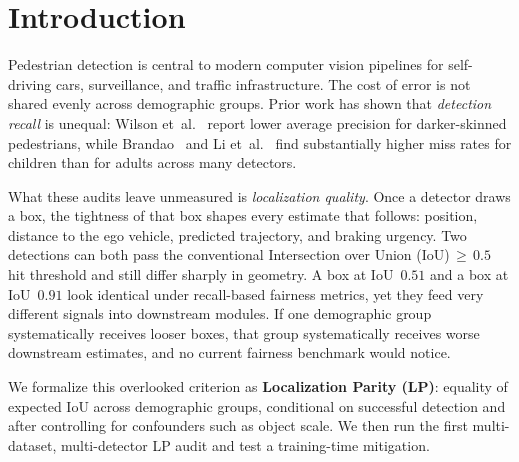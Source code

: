 \documentclass[runningheads]{llncs}
\begin{document}
\section{Introduction}
\label{sec:intro}

Pedestrian detection is central to modern computer vision pipelines for
self-driving cars, surveillance, and traffic infrastructure. The cost of error
is not shared evenly across demographic groups. Prior work has shown that
\emph{detection recall} is unequal: Wilson et~al.~\cite{wilson2019predictive}
report lower average precision for darker-skinned pedestrians, while
Brandao~\cite{brandao2019age} and Li et~al.~\cite{li2025bias} find substantially
higher miss rates for children than for adults across many detectors.

What these audits leave unmeasured is \emph{localization quality}. Once a
detector draws a box, the tightness of that box shapes every estimate that
follows: position, distance to the ego vehicle, predicted trajectory, and
braking urgency. Two detections can both pass the conventional Intersection
over Union (IoU)\,$\geq$\,$0.5$ hit threshold and still differ sharply in
geometry. A box at IoU~$0.51$ and a box at IoU~$0.91$ look identical under
recall-based fairness metrics, yet they feed very different signals into
downstream modules. If one demographic group systematically receives looser
boxes, that group systematically receives worse downstream estimates, and no
current fairness benchmark would notice.

We formalize this overlooked criterion as \textbf{Localization Parity (LP)}:
equality of expected IoU across demographic groups, conditional on successful
detection and after controlling for confounders such as object scale. We then
run the first multi-dataset, multi-detector LP audit and test a training-time
mitigation.
\end{document}
